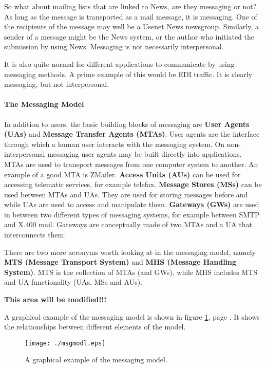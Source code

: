 So what about mailing lists that are linked to News, are they messaging or not?
As long as the message is transported as a mail message, it is messaging.
One of the recipients of the message may well be a Usenet News newsgroup.
Similarly, a sender of a message might be the News system, or the author
who initiated the submission by using News. Messaging is not necessarily
interpersonal.

It is also quite normal for different applications to communicate by using
messaging methods.
A prime example of this would be EDI traffic. It is clearly messaging,
but not interpersonal.



\paragraph{The Messaging Model}

In addition to users, the basic building blocks of messaging are
{\bf User Agents (UAs)} and {\bf Message Transfer Agents (MTAs)}.
User agents are the interface through which a human user interacts with
the messaging system.
On non-interpersonal messaging user agents may be built directly into
applications.
MTAs are used to transport messages from one computer system to another.
An example of a good MTA is ZMailer. 
{\bf Access Units (AUs)} can be used for accessing telematic services,
for example telefax. 
{\bf Message Stores (MSs)} can be used between MTAs and UAs.
They are used for storing messages before and while UAs are used
to access and manipulate them.
{\bf Gateways (GWs)} are used in between two different types
of messaging systems, for example between SMTP and X.400 mail.
Gateways are conceptually made of two MTAs and a UA that interconnects them.

There are two more acronyms worth looking at in the messaging model,
namely {\bf MTS (Message Transport System)} and
{\bf MHS (Message Handling System)}.
MTS is the collection of MTAs (and GWs),
while MHS includes MTS and UA functionality (UAs, MSs and AUs).

{\bf This area will be modified!!!}



A graphical example of the messaging model is shown in figure 
\ref{msgmodl}, page \pageref{msgmodl}. It 
shows the relationships between different elements of the model.

\begin{figure}[tbp]
  \htmlimage{}
  \centering\texttt{[image: ./msgmodl.eps]}
  \caption{\label{msgmodl}A graphical example of the messaging model.}
\end{figure}








